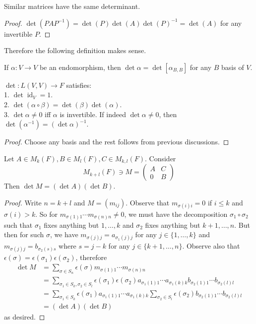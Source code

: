 \begin{lemma}
    Similar matrices have the same determinant.
\end{lemma}
\begin{proof}
    $\det(PAP^{-1})=\det(P)\det(A)\det(P)^{-1}=\det(A)$ for any invertible $P$.
\end{proof}
Therefore the following definition makes sense.
\begin{definition}
    If $\alpha:V\to V$ be an endomorphism, then $\det\alpha=\det[\alpha_{B,B}]$ for any $B$ basis of $V$.
\end{definition}
\begin{theorem}
    $\det:L(V,V)\to F$ satisfies:\\
    1. $\det\operatorname{id}_V=1$.\\
    2. $\det(\alpha\circ\beta)=\det(\beta)\det(\alpha)$.\\
    3. $\det\alpha\neq 0$ iff $\alpha$ is invertible.
    If indeed $\det\alpha\neq 0$, then $\det(\alpha^{-1})=(\det\alpha)^{-1}$.
\end{theorem}
\begin{proof}
    Choose any basis and the rest follows from previous discussions.
\end{proof}
\begin{lemma}
    Let $A\in M_k(F),B\in M_l(F),C\in M_{k,l}(F)$.
    Consider
    $$M_{k+l}(F)\ni M=\left( \begin{array}{c|c}
        A&C\\ \hline
        0&B
    \end{array} \right)$$
    Then $\det M=(\det A)(\det B)$.
\end{lemma}
\begin{proof}
    Write $n=k+l$ and $M=(m_{ij})$.
    Observe that $m_{\sigma(i)i}=0$ if $i\le k$ and $\sigma(i)>k$.
    So for $m_{\sigma(1)1}\cdots m_{\sigma(n)n}\neq 0$, we must have the decomposition $\sigma_1\circ\sigma_2$ such that $\sigma_1$ fixes anything but $1,\ldots, k$ and $\sigma_2$ fixes anything but $k+1,\ldots,n$.
    But then for such $\sigma$, we have $m_{\sigma(j)j}=a_{\sigma_1(j)j}$ for any $j\in\{1,\ldots,k\}$ and $m_{\sigma(j)j}=b_{\sigma_2(s)s}$ where $s=j-k$ for any $j\in\{k+1,\ldots,n\}$.
    Observe also that $\epsilon(\sigma)=\epsilon(\sigma_1)\epsilon(\sigma_2)$, therefore
    \begin{align*}
        \det M&=\sum_{\sigma\in S_n}\epsilon(\sigma)m_{\sigma(1)1}\cdots m_{\sigma(n)n}\\
        &=\sum_{\sigma_1\in S_k,\sigma_2\in S_l}\epsilon(\sigma_1)\epsilon(\sigma_2)a_{\sigma_1(1)1}\cdots a_{\sigma_1(k)k}b_{\sigma_2(1)1}\cdots b_{\sigma_2(l)l}\\
        &=\sum_{\sigma_1\in S_k}\epsilon(\sigma_1)a_{\sigma_1(1)1}\cdots a_{\sigma_1(k)k}\sum_{\sigma_2\in S_l}\epsilon(\sigma_2)b_{\sigma_2(1)1}\cdots b_{\sigma_2(l)l}\\
        &=(\det A)(\det B)
    \end{align*}
    as desired.
\end{proof}
